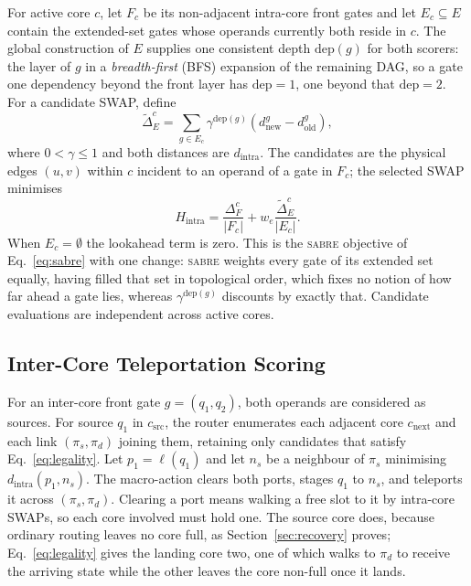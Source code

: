 \documentclass[journal]{IEEEtran}
\newcommand{\SABRE}{\textsc{sabre}}
\newcommand{\dintra}{d_{\mathrm{intra}}}
\begin{document}
For active core $c$, let $F_c$ be its non-adjacent intra-core front gates and let $E_c\subseteq E$ contain the extended-set gates whose operands currently both reside in $c$. The global construction of $E$ supplies one consistent depth $\mathrm{dep}(g)$ for both scorers: the layer of $g$ in a \emph{breadth-first} (BFS) expansion of the remaining DAG, so a gate one dependency beyond the front layer has $\mathrm{dep}=1$, one beyond that $\mathrm{dep}=2$. For a candidate SWAP, define
\begin{equation}
\widetilde{\Delta}_E^c=
\sum_{g\in E_c}\gamma^{\mathrm{dep}(g)}
\left(d^g_{\mathrm{new}}-d^g_{\mathrm{old}}\right),
\label{Delta_E_Tilde}
\end{equation}
where $0<\gamma\le1$ and both distances are $\dintra$. The candidates are the physical edges $(u,v)$ within $c$ incident to an operand of a gate in $F_c$; the selected SWAP minimises
\begin{equation}
H_{\mathrm{intra}}=
\frac{\Delta_F^c}{|F_c|}+w_e\frac{\widetilde{\Delta}_E^c}{|E_c|}.
\label{eq:intra}
\end{equation}
When $E_c=\emptyset$ the lookahead term is zero. This is the \SABRE{} objective of Eq.~\eqref{eq:sabre} with one change: \SABRE{} weights every gate of its extended set equally, having filled that set in topological order, which fixes no notion of how far ahead a gate lies, whereas $\gamma^{\mathrm{dep}(g)}$ discounts by exactly that. Candidate evaluations are independent across active cores.

\subsection{Inter-Core Teleportation Scoring}
\label{sec:tele}

For an inter-core front gate $g=(q_1,q_2)$, both operands are considered as sources. For source $q_1$ in $c_{\mathrm{src}}$, the router enumerates each adjacent core $c_{\mathrm{next}}$ and each link $(\pi_s,\pi_d)$ joining them, retaining only candidates that satisfy Eq.~\eqref{eq:legality}. Let $p_1=\ell(q_1)$ and let $n_s$ be a neighbour of $\pi_s$ minimising $\dintra(p_1,n_s)$. The macro-action clears both ports, stages $q_1$ to $n_s$, and teleports it across $(\pi_s,\pi_d)$. Clearing a port means walking a free slot to it by intra-core SWAPs, so each core involved must hold one. The source core does, because ordinary routing leaves no core full, as Section~\ref{sec:recovery} proves; Eq.~\eqref{eq:legality} gives the landing core two, one of which walks to $\pi_d$ to receive the arriving state while the other leaves the core non-full once it lands.
\end{document}
